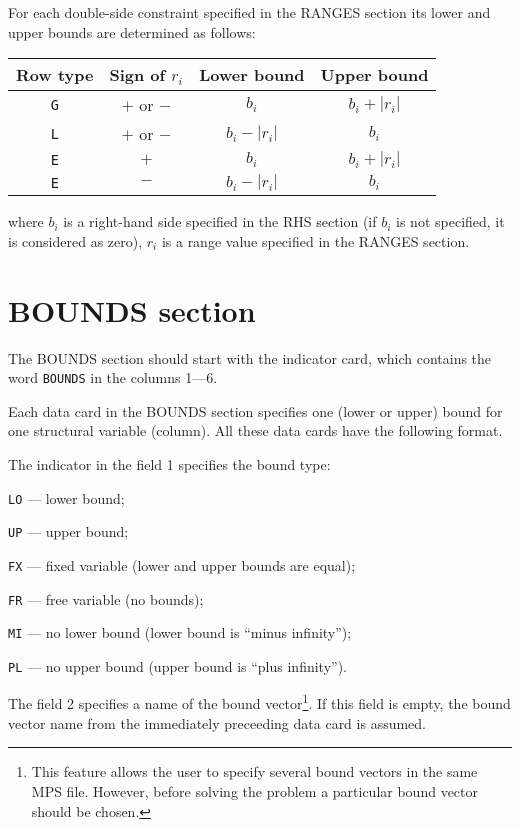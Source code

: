 For each double-side constraint specified in the RANGES section its
lower and upper bounds are determined as follows:


\begin{center}
\begin{tabular}{cccc}
Row type & Sign of $r_i$ & Lower bound & Upper bound \\
\hline
{\tt G} & $+$ or $-$ & $b_i$ & $b_i + |r_i|$ \\
{\tt L} & $+$ or $-$ & $b_i - |r_i|$ & $b_i$ \\
{\tt E} & $+$ & $b_i$ & $b_i + |r_i|$ \\
{\tt E} & $-$ & $b_i - |r_i|$ & $b_i$ \\
\end{tabular}
\end{center}

\noindent
where $b_i$ is a right-hand side specified in the RHS section (if $b_i$
is not specified, it is considered as zero), $r_i$ is a range value
specified in the RANGES section.

\section{BOUNDS section}
\label{secbounds}

The BOUNDS section should start with the indicator card, which contains
the word \verb|BOUNDS| in the columns 1---6.

Each data card in the BOUNDS section specifies one (lower or upper)
bound for one structural variable (column). All these data cards have
the following format.

The indicator in the field 1 specifies the bound type:

\verb|LO| --- lower bound;

\verb|UP| --- upper bound;

\verb|FX| --- fixed variable (lower and upper bounds are equal);

\verb|FR| --- free variable (no bounds);

\verb|MI| --- no lower bound (lower bound is ``minus infinity'');

\verb|PL| --- no upper bound (upper bound is ``plus infinity'').

The field 2 specifies a name of the bound vector\footnote{This feature
allows the user to specify several bound vectors in the same MPS file.
However, before solving the problem a particular bound vector should be
chosen.}. If this field is empty, the bound vector name from the
immediately preceeding data card is assumed.

